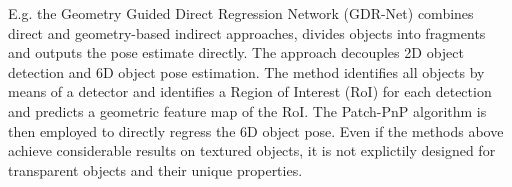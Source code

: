 E.g. the Geometry Guided Direct Regression Network (GDR-Net) \cite{gdrnet} combines direct and geometry-based indirect approaches, divides objects into fragments and outputs the pose estimate directly. 
The approach decouples 2D object detection and 6D object pose estimation.
The method identifies all objects by means of a detector and identifies a Region of Interest (RoI) for each detection and predicts a geometric feature map of the RoI.
The Patch-PnP algorithm is then employed to directly regress the 6D object pose. 
Even if the methods above achieve considerable results on textured objects, it is not explictily designed for transparent objects and their unique properties.

